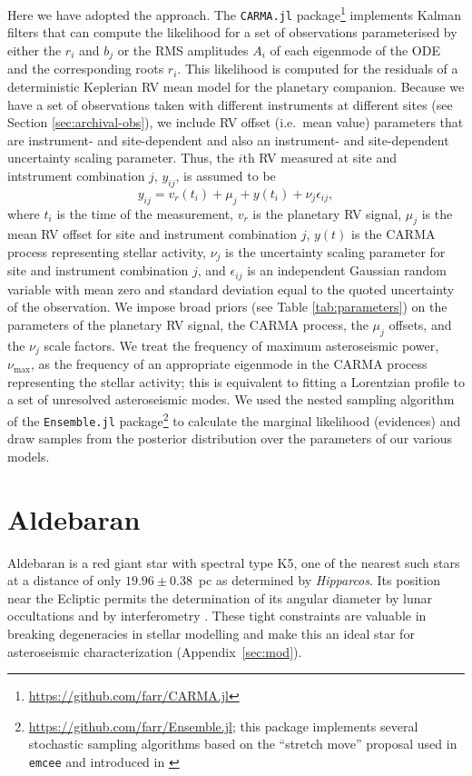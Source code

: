 \documentclass[modern]{aastex61}
\newcommand{\hipparcos}{\emph{Hipparcos}\xspace}
\begin{document}
Here we have adopted the \citet{Kelly2014} approach.  The \texttt{CARMA.jl}
package\footnote{\url{https://github.com/farr/CARMA.jl}} implements Kalman
filters that can compute the likelihood for a set of observations parameterised
by either the $r_i$ and $b_j$ or the RMS amplitudes $A_i$ of each eigenmode of
the ODE and the corresponding roots $r_i$. This likelihood is computed for the
residuals of a deterministic Keplerian RV mean model for the planetary
companion.  Because we have a set of observations taken with different
instruments at different sites (see Section \ref{sec:archival-obs}), we include
RV offset (i.e.\ mean value) parameters that are instrument- and site-dependent
and also an instrument- and site-dependent uncertainty scaling parameter.  Thus,
the $i$th RV measured at site and intstrument combination $j$, $y_{ij}$, is
assumed to be
%
\begin{equation}
  \label{eq:RV-model}
  y_{ij} = v_r\left(t_i\right) + \mu_j + y\left( t_i \right) + \nu_j
\epsilon_{ij},
\end{equation}
%
where $t_i$ is the time of the measurement, $v_r$ is the planetary RV signal,
$\mu_j$ is the mean RV offset for site and instrument combination $j$, $y(t)$ is
the CARMA process representing stellar activity, $\nu_j$ is the uncertainty
scaling parameter for site and instrument combination $j$, and $\epsilon_{ij}$
is an independent Gaussian random variable with mean zero and standard deviation
equal to the quoted uncertainty of the observation.  We impose broad priors (see
Table \ref{tab:parameters}) on the parameters of the planetary RV signal, the
CARMA process, the $\mu_j$ offsets, and the $\nu_j$ scale factors.  We treat the
frequency of maximum asteroseismic power, $\nu_\mathrm{max}$, as the frequency
of an appropriate eigenmode in the CARMA process representing the stellar
activity; this is equivalent to fitting a Lorentzian profile to a set of
unresolved asteroseismic modes.  We used the nested sampling algorithm of the
\texttt{Ensemble.jl} package\footnote{\url{https://github.com/farr/Ensemble.jl};
this package implements several stochastic sampling algorithms based on the
``stretch move'' proposal used in \texttt{emcee} \citep{Foreman-Mackey2013} and
introduced in \citet{Goodman2010}} to calculate the marginal likelihood
(evidences) and draw samples from the posterior distribution over the parameters
of our various models.

\section{Aldebaran}
Aldebaran is a red giant star with spectral type K5, one of the nearest such stars at a distance of only $19.96 \pm 0.38$~pc as determined by \hipparcos \citep{hipparcos}. Its position near the Ecliptic permits the determination of its angular diameter by lunar occultations and by interferometry \citep[$20.58 \pm 0.03$ mas;][]{richichi2005,1979ApJ...228L.111B,brown1979,panek1980}. These tight constraints are valuable in breaking degeneracies in stellar modelling and make this an ideal star for asteroseismic characterization (Appendix~\ref{sec:mod}).
\end{document}

